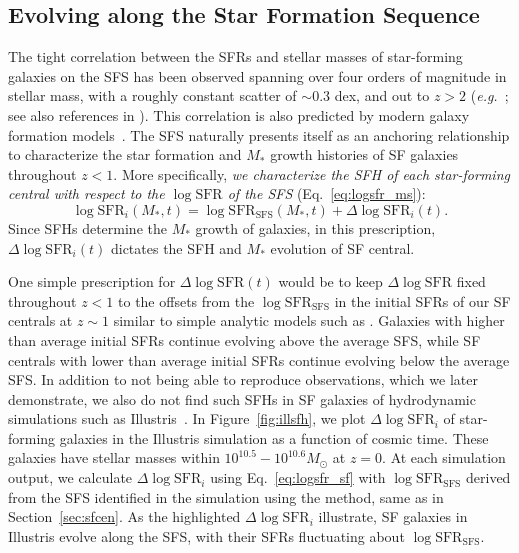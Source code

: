 \documentclass[12pt, letterpaper, preprint, tighten]{aastex62}
\newcommand{\edt}[1]{{\color{dred}{\bf} #1}}
\newcommand{\beq}{\begin{equation}}
\newcommand{\eeq}{\end{equation}}
\newcommand{\logsfr}{\log\mathrm{SFR}}
\newcommand{\logsfrsfs}{\log\mathrm{SFR}_\mathrm{SFS}}
\begin{document}
\subsection{Evolving along the Star Formation Sequence} \label{sec:modelevol}
The tight correlation between the SFRs and stellar masses of star-forming
galaxies on the SFS has been observed spanning over four orders of magnitude
in stellar mass, with a roughly constant scatter of ${\sim}0.3$ dex, and out
to $z > 2$
(\emph{e.g.}~\citealt{noeske2007,daddi2007,elbaz2007,salim2007,santini2009,karim2011,whitaker2012,moustakas2013,lee2015}; see also references in \citealt{speagle2014}).
This correlation is also predicted by modern galaxy formation models~\citep[][see
\citealt{hahn2018a} and references therein]{somerville2015}. The SFS
naturally presents itself as an anchoring relationship to characterize
the star formation and $M_*$ growth histories of SF galaxies throughout $z < 1$. More
specifically, \emph{we characterize the SFH of each star-forming central
with respect to the $\logsfr$ of the SFS} (Eq.~\ref{eq:logsfr_ms}):
\beq \label{eq:logsfr_sf}
\logsfr_i(M_*, t) = \logsfrsfs(M_*, t) + \Delta\logsfr_i(t).
\eeq
Since SFHs determine the $M_*$ growth of galaxies, in this prescription,
$\Delta \logsfr_i(t)$ dictates the SFH and $M_*$ evolution of SF central.

One simple prescription for $\Delta \logsfr(t)$ would be to keep $\Delta \logsfr$
fixed throughout $z < 1$ to the offsets from the $\logsfrsfs$ in the
initial SFRs of our SF centrals at $z\sim1$ similar to simple analytic
models such as \cite{mitra2015}. Galaxies with higher than average
initial SFRs continue evolving above the average SFS, while SF centrals
with lower than average initial SFRs continue evolving below the average
SFS. In addition to not being able to reproduce observations, which we
later demonstrate, we also do not find such SFHs in SF galaxies of
hydrodynamic simulations such as Illustris~\citep{vogelsberger2014,genel2014}.
In Figure~\ref{fig:illsfh}, we plot $\Delta \logsfr_i$ of star-forming
galaxies in the Illustris simulation as a function of cosmic time. These
galaxies have stellar masses within $10^{10.5}-10^{10.6}M_\odot$ at $z=0$.
At each simulation output, we calculate $\Delta \logsfr_i$ using Eq.~\ref{eq:logsfr_sf}
with $\logsfrsfs$ derived from the SFS identified
\edt{in the simulation}
using the \cite{hahn2018a} method, same as in Section~\ref{sec:sfcen}. As the
highlighted $\Delta \logsfr_i$ illustrate, SF galaxies in Illustris evolve
along the SFS, with their SFRs fluctuating about $\logsfrsfs$.
\end{document}
